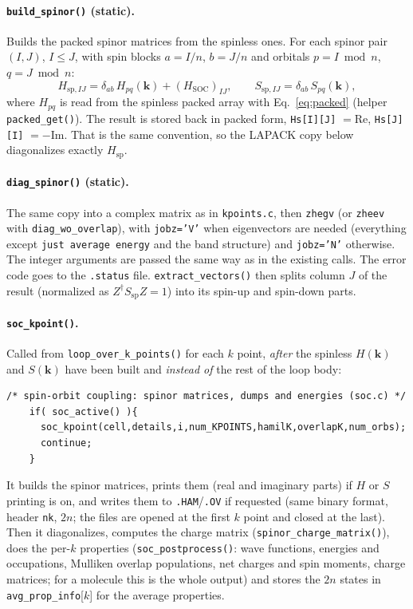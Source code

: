 \documentclass[11pt,a4paper]{article}
\newcommand{\file}[1]{\texttt{#1}}
\newcommand{\fn}[1]{\texttt{#1()}}
\newcommand{\var}[1]{\texttt{#1}}
\newcommand{\Hsoc}{H_{\mathrm{SOC}}}
\begin{document}
\paragraph{\fn{build\_spinor} (static).} Builds the packed spinor matrices from the
spinless ones. For each spinor pair $(I,J)$, $I\le J$, with spin blocks $a=I/n$, $b=J/n$
and orbitals $p=I\bmod n$, $q=J\bmod n$:
\begin{equation}
H_{\mathrm{sp},IJ} = \delta_{ab}\,H_{pq}(\mathbf{k}) + (\Hsoc)_{IJ},\qquad
S_{\mathrm{sp},IJ} = \delta_{ab}\,S_{pq}(\mathbf{k}),
\end{equation}
where $H_{pq}$ is read from the spinless packed array with Eq.~\eqref{eq:packed}
(helper \fn{packed\_get}). The result is stored back in packed form,
\texttt{Hs[I][J]} $=\mathrm{Re}$, \texttt{Hs[J][I]} $=-\mathrm{Im}$. That is the same
convention, so the LAPACK copy below diagonalizes exactly $H_{\mathrm{sp}}$.

\paragraph{\fn{diag\_spinor} (static).} The same copy into a complex matrix as in
\file{kpoints.c}, then \texttt{zhegv} (or \texttt{zheev} with \texttt{diag\_wo\_overlap}),
with \texttt{jobz='V'} when eigenvectors are needed (everything except \texttt{just
average energy} and the band structure) and \texttt{jobz='N'} otherwise. The integer
arguments are passed the same way as in the existing calls. The error code goes to the
\texttt{.status} file. \fn{extract\_vectors} then splits column $J$ of the result
(normalized as $Z^\dagger S_{\mathrm{sp}} Z=1$) into its spin-up and spin-down parts.

\paragraph{\fn{soc\_kpoint}.} Called from \fn{loop\_over\_k\_points} for each $k$ point,
\emph{after} the spinless $H(\mathbf{k})$ and $S(\mathbf{k})$ have been built and
\emph{instead of} the rest of the loop body:
\begin{lstlisting}[caption={\file{kpoints.c}}]
    /* spin-orbit coupling: spinor matrices, dumps and energies (soc.c) */
    if( soc_active() ){
      soc_kpoint(cell,details,i,num_KPOINTS,hamilK,overlapK,num_orbs);
      continue;
    }
\end{lstlisting}
It builds the spinor matrices, prints them (real and imaginary parts) if $H$ or $S$
printing is on, and writes them to \texttt{.HAM}/\texttt{.OV} if requested (same binary
format, header \texttt{nk}, $2n$; the files are opened at the first $k$ point and closed
at the last). Then it diagonalizes, computes the charge matrix
(\fn{spinor\_charge\_matrix}), does the per-$k$ properties (\fn{soc\_postprocess}: wave
functions, energies and occupations, Mulliken overlap populations, net charges and spin
moments, charge matrices; for a molecule this is the whole output) and stores the $2n$
states in \var{avg\_prop\_info}[$k$] for the average properties.
\end{document}
